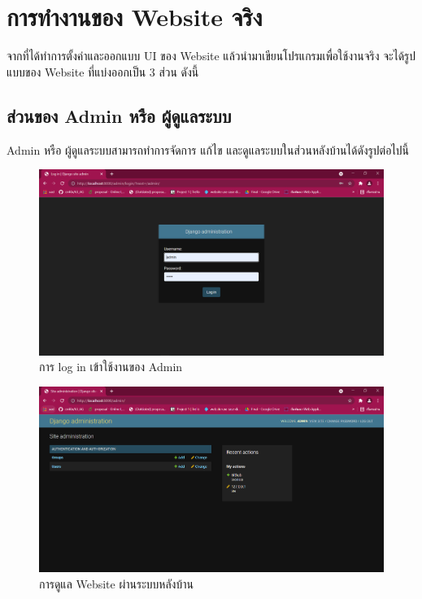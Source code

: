 \section{การทำงานของ Website จริง}
จากที่ได้ทำการตั้งค่าและออกแบบ UI ของ Website แล้วนำมาเขียนโปรแกรมเพื่อใช้งานจริง จะได้รูปแบบของ Website ที่แบ่งออกเป็น 3 ส่วน ดังนี้

\subsection{ส่วนของ Admin หรือ ผู้ดูแลระบบ}
Admin หรือ ผู้ดูแลระบบสามารถทำการจัดการ แก้ไข และดูแลระบบในส่วนหลังบ้านได้ดังรูปต่อไปนี้
\begin{figure}[H]
    \captionsetup{justification=centering}
    \centering
    \includegraphics[width=5in]{figures/admin.png}
    \caption{การ log in เข้าใช้งานของ Admin}
    \label{figure:adminsite}
\end{figure}

\begin{figure}[!thb]
    \captionsetup{justification=centering}
    \centering
    \includegraphics[width=5in]{figures/adminlogin.png}
    \caption{การดูแล Website ผ่านระบบหลังบ้าน}
    \label{figure:adminsite}
\end{figure}

